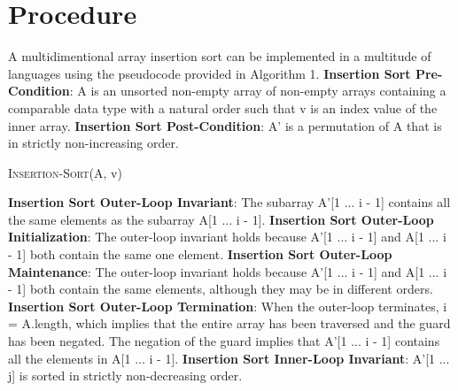 \documentclass[onecolumn, 12pt, article]{IEEEtran}
\numberwithin{case}{problem}
\numberwithin{condition}{problem}
\numberwithin{condition}{subsection}
\numberwithin{definition}{section}
\theoremstyle{remark}
\numberwithin{question}{problem}
\theoremstyle{plain}
\numberwithin{answer}{problem}
\numberwithin{solution}{section}
\numberwithin{equation}{section}%
\begin{document}

\section{Procedure}
A multidimentional array insertion sort can be implemented in a multitude of languages using the pseudocode provided in Algorithm 1.
\newline
\textbf{Insertion Sort Pre-Condition}: A is an unsorted non-empty array of non-empty arrays containing a comparable data type with a natural order such that v is an index value of the inner array.
\newline
\textbf{Insertion Sort Post-Condition}: A' is a permutation of A that is in strictly non-increasing order.
\begin{algorithm}
\caption {\textsc{Insertion-Sort}(A, v)}
\label{algo:insertionsort}
\begin{algorithmic}[1]
\EndIf
{}
	\EndWhile
\EndWhile
{}
\EndProcedure
\end{algorithmic}
\end{algorithm}
\newline
\textbf{Insertion Sort Outer-Loop Invariant}: The subarray A'[1 ... i - 1] contains all the same elements as the subarray A[1 ... i - 1].
\newline 
\textbf{Insertion Sort Outer-Loop Initialization}: The outer-loop invariant holds because A'[1 ... i - 1] and A[1 ... i - 1] both contain the same one element.
\newline
\textbf{Insertion Sort Outer-Loop Maintenance}: The outer-loop invariant holds because A'[1 ... i - 1] and A[1 ... i - 1] both contain the same elements, although they may be in different orders.
\newline
\textbf{Insertion Sort Outer-Loop Termination}: When the outer-loop terminates, i = A.length, which implies that the entire array has been traversed and the guard has been negated. The negation of the guard implies that A'[1 ... i - 1] contains all the elements in A[1 ... i - 1].
\newline
\newline
\textbf{Insertion Sort Inner-Loop Invariant}: A'[1 ... j] is sorted in strictly non-decreasing order.
\end{document}
